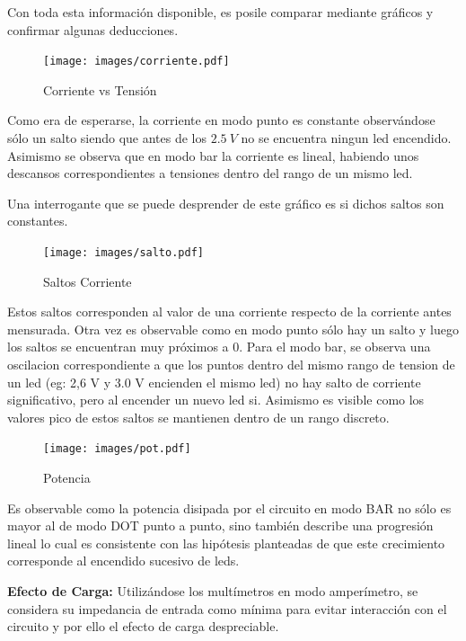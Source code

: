 \documentclass[12pt,a4paper]{article}
\begin{document}
			Con toda esta información disponible, es posile comparar mediante gráficos y confirmar algunas deducciones.

			\begin{figure}[H]
			\centering
				\texttt{[image: images/corriente.pdf]}\caption{Corriente vs Tensión}\label{fig:corriente}
			\end{figure}

			Como era de esperarse, la corriente en modo punto es constante observándose sólo un salto siendo que antes de los $2.5 \:V$ no se encuentra ningun led encendido. Asimismo se observa que en modo bar la corriente es lineal, habiendo unos descansos correspondientes a tensiones dentro del rango de un mismo led. 

			Una interrogante que se puede desprender de este gráfico es si dichos saltos son constantes.

			\begin{figure}[H]
			\centering
				\texttt{[image: images/salto.pdf]}\caption{Saltos Corriente}
			\end{figure}

			Estos saltos corresponden al valor de una corriente respecto de la corriente antes mensurada. Otra vez es observable como en modo punto sólo hay un salto y luego los saltos se encuentran muy próximos a 0. Para el modo bar, se observa una oscilacion correspondiente a que los puntos dentro del mismo rango de tension de un led (eg: 2,6 V y 3.0 V encienden el mismo led) no hay salto de corriente significativo, pero al encender un nuevo led si. Asimismo es visible como los valores pico de estos saltos se mantienen dentro de un rango discreto.

			\begin{figure}[H]
			\centering
				\texttt{[image: images/pot.pdf]}\caption{Potencia}\label{fig:potencia}
			\end{figure}

			Es observable como la potencia disipada por el circuito en modo BAR no sólo es mayor al de modo DOT punto a punto, sino también describe una progresión lineal lo cual es consistente con las hipótesis planteadas de que este crecimiento corresponde al encendido sucesivo de leds.

			\textbf{Efecto de Carga:} Utilizándose los multímetros en modo amperímetro, se considera su impedancia de entrada como mínima para evitar interacción con el circuito y por ello el efecto de carga despreciable.
\end{document}
